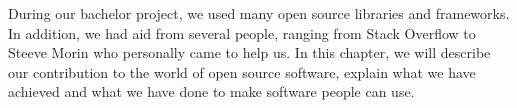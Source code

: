 During our bachelor project, we used many open source libraries and frameworks. In addition, we had aid from several people, ranging from Stack Overflow to Steeve Morin who personally came to help us. In this chapter, we will describe our contribution to the world of open source software, explain what we have achieved and what we have done to make software people can use.